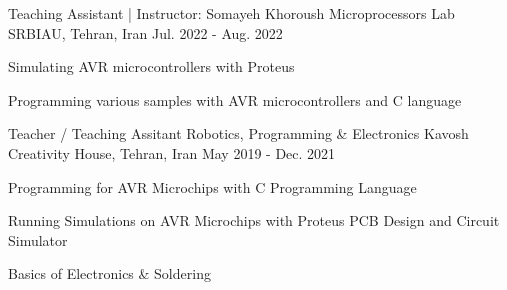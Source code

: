 \begin{cventries}

\cventry
{Teaching Assistant | Instructor: Somayeh Khoroush} %
{Microprocessors Lab} %
{SRBIAU, Tehran, Iran} %
{Jul. 2022 - Aug. 2022} %
{ %
\begin{cvitems}
\item {Simulating AVR microcontrollers with Proteus}
\item {Programming various samples with AVR microcontrollers and C language}
\end{cvitems}
}


\cventry
{Teacher / Teaching Assitant} %
{Robotics, Programming \& Electronics} %
{Kavosh Creativity House, Tehran, Iran} %
{May 2019 - Dec. 2021} %
{ %
\begin{cvitems}
\item {Programming for AVR Microchips with C Programming Language}
\item {Running Simulations on AVR Microchips with Proteus PCB Design and Circuit Simulator}
\item {Basics of Electronics \& Soldering}
\end{cvitems}
}


\end{cventries}